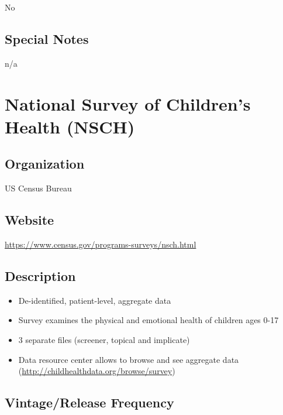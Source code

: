 \documentclass[
]{book}
\providecommand{\tightlist}{%
  \setlength{\itemsep}{0pt}\setlength{\parskip}{0pt}}
\begin{document}
No

\hypertarget{special-notes-61}{%
\section{Special Notes}\label{special-notes-61}}

n/a

\mainmatter

\hypertarget{national-survey-of-childrens-health-nsch}{%
\chapter{National Survey of Children's Health (NSCH)}\label{national-survey-of-childrens-health-nsch}}

\hypertarget{organization-62}{%
\section{Organization}\label{organization-62}}

US Census Bureau

\hypertarget{website-62}{%
\section{Website}\label{website-62}}

\url{https://www.census.gov/programs-surveys/nsch.html}

\hypertarget{description-62}{%
\section{Description}\label{description-62}}

\begin{itemize}
\tightlist
\item
  De-identified, patient-level, aggregate data
\item
  Survey examines the physical and emotional health of children ages 0-17
\item
  3 separate files (screener, topical and implicate)
\item
  Data resource center allows to browse and see aggregate data (\url{http://childhealthdata.org/browse/survey})
\end{itemize}

\hypertarget{vintagerelease-frequency-62}{%
\section{Vintage/Release Frequency}\label{vintagerelease-frequency-62}}
\end{document}
